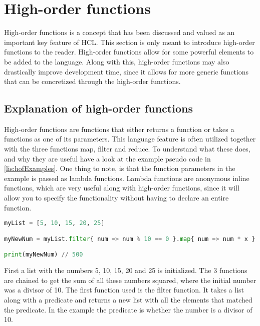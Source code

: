 \section{High-order functions}
High-order functions is a concept that has been discussed and valued as an important key feature of HCL.
This section is only meant to introduce high-order functions to the reader.
High-order functions allow for some powerful elements to be added to the language.
Along with this, high-order functions may also drastically improve development time, since it allows for more generic functions that can be concretized through the high-order functions.

\subsection{Explanation of high-order functions}
High-order functions are functions that either returns a function or takes a functions as one of its parameters. 
This language feature is often utilized together with the three functions map, filter and reduce. 
To understand what these does, and why they are useful have a look at the example pseudo code in \ref{lis:hofExamples}. 
One thing to note, is that the function parameters in the example is passed as lambda functions. 
Lambda functions are anonymous inline functions, which are very useful along with high-order functions, since it will allow you to specify the functionality without having to declare an entire function.

\begin{lstlisting}[language=Python,label=lis:hofExamples,caption=An example of the map\, filter and reduce functions.,firstnumber=1]
myList = [5, 10, 15, 20, 25]

myNewNum = myList.filter{ num => num % 10 == 0 }.map{ num => num * x }.reduce{ sumOfNums, num => sumOfNums + num }

print(myNewNum) // 500
\end{lstlisting}

First a list with the numbers 5, 10, 15, 20 and 25 is initialized. 
The 3 functions are chained to get the sum of all these numbers squared, where the initial number was a divisor of 10.
The first function used is the filter function. 
It takes a list along with a predicate and returns a new list with all the elements that matched the predicate.
In the example the predicate is whether the number is a divisor of 10.

